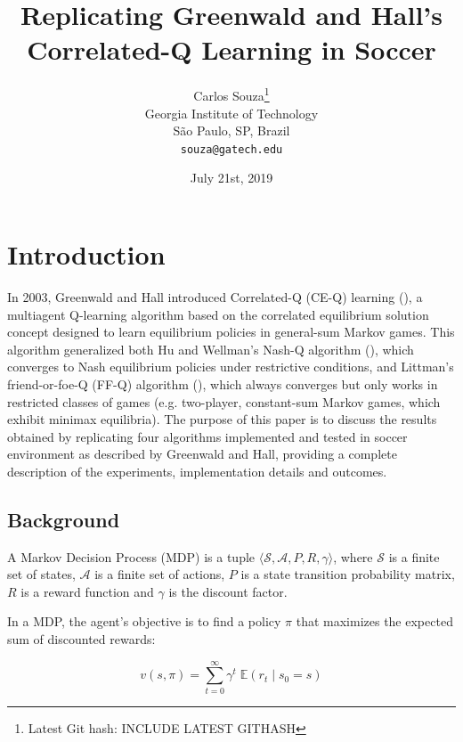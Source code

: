 \documentclass{article}
\title{Replicating Greenwald and Hall's Correlated-Q Learning in Soccer}
\date{July 21st, 2019}
\author{
Carlos Souza\thanks{Latest Git hash: INCLUDE LATEST GITHASH}\\
Georgia Institute of Technology\\
São Paulo, SP, Brazil \\
\texttt{souza@gatech.edu} \\
}
\begin{document}
    \maketitle

    \begin{abstract}
        \lipsum[1]
    \end{abstract}


    \section{Introduction}
    \label{sec:introduction}
    In 2003, Greenwald  and Hall introduced Correlated-Q (CE-Q) learning (\cite{greenwald2003}), a multiagent Q-learning algorithm based on the correlated equilibrium solution concept designed to learn equilibrium policies in general-sum Markov games.
    This algorithm generalized both Hu and Wellman's Nash-Q algorithm (\cite{hu1998}), which converges to Nash equilibrium policies under restrictive conditions, and Littman's friend-or-foe-Q (FF-Q) algorithm (\cite{littman2001}), which always converges but only works in restricted classes of games (e.g. two-player, constant-sum Markov games, which exhibit minimax equilibria).
    The purpose of this paper is to discuss the results obtained by replicating four algorithms implemented and tested in soccer environment as described by Greenwald and Hall, providing a complete description of the experiments, implementation details and outcomes.

    \subsection{Background}
    \label{subsec:background}
    A Markov Decision Process (MDP) is a tuple $\langle \mathcal{S}, \mathcal{A}, P, R, \gamma \rangle$, where $\mathcal{S}$ is a finite set of states, $\mathcal{A}$ is a finite set of actions, $P$ is a state transition probability matrix, $R$ is a reward function and $\gamma$ is the discount factor.

    In a MDP, the agent's objective is to find a policy $\pi$ that maximizes the expected sum of discounted rewards:

    \begin{equation}
        v(s, \pi) = \sum_{t=0}^{\infty} \gamma^{t} \; \mathbb{E}(r_{t} \; | \; s_{0} = s)
    \end{equation}
\end{document}
